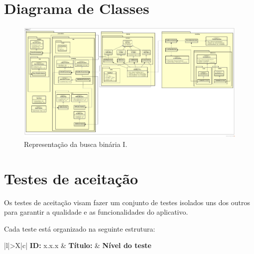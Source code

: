 \documentclass[
	12pt,				%
	oneside,			%
	a4paper,			%
	brazil				%
]{abntex2}
\begin{document}
{\postextual



\begin{apendicesenv}
\partapendices

\chapter{Diagrama de Classes}

\begin{figure}[H]
\centering
\includegraphics[angle=90, width=12cm, center]{images/app-class-diagram}
\caption{Representação da busca binária I.}
\label{Rotulo}
\end{figure}

\chapter{Testes de aceitação}

Os testes de aceitação visam fazer um conjunto de testes isolados uns dos outros para garantir a qualidade e as funcionalidades do aplicativo.

Cada teste está organizado na seguinte estrutura:

\bgroup
\def\arraystretch{1.5}
\begin{table}[H]

\begin{tabularx}{\textwidth}{|l|>{\hsize}X|c|}
\hline 
\textbf{ID:} x.x.x & \textbf{Título:}  & \textbf{Nível do teste} \\ 
\hline 
{} \\ 
\hline  
{} \\ 
\hline 
{} \\ 
\hline 
{} \\ 
\hline 
{} \\ 
\hline 
\end{tabularx} 


\end{table}
\end{apendicesenv}}
\end{document}
